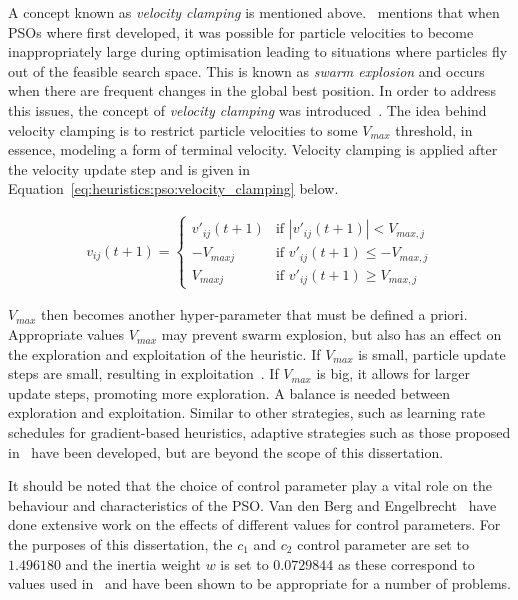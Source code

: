 A concept known as \textit{velocity clamping} is mentioned above.~\citeauthor{ref:vanwyk:2014}\cite{ref:vanwyk:2014} mentions that when \acp{PSO} where first developed, it was possible for particle velocities to become inappropriately large during optimisation leading to situations where particles fly out of the feasible search space. This is known as \textit{swarm explosion} and occurs when there are frequent changes in the global best position. In order to address this issues, the concept of \textit{velocity clamping} was introduced~\cite{ref:eberhart:1996}. The idea behind velocity clamping is to restrict particle velocities to some $V_{max}$ threshold, in essence, modeling a form of terminal velocity. Velocity clamping is applied after the velocity update step and is given in Equation~\ref{eq:heuristics:pso:velocity_clamping} below.

\begin{equation}
      \label{eq:heuristics:pso:velocity_clamping}
      \begin{split}
            v_{ij}(t+1)=
            \begin{cases}
                  v'_{ij}(t+1) & \text{if } |v'_{ij}(t+1)| < V_{max,j}   \\
                  -V_{maxj}    & \text{if } v'_{ij}(t+1) \leq -V_{max,j} \\
                  V_{maxj}     & \text{if } v'_{ij}(t+1) \geq V_{max,j}
            \end{cases}
      \end{split}
\end{equation}

$V_{max}$ then becomes another hyper-parameter that must be defined a priori. Appropriate values $V_{max}$ may prevent swarm explosion, but also has an effect on the exploration and exploitation of the heuristic. If $V_{max}$ is small, particle update steps are small, resulting in exploitation~\cite{ref:eberhart:1996}. If $V_{max}$ is big, it allows for larger update steps, promoting more exploration. A balance is needed between exploration and exploitation. Similar to other strategies, such as learning rate schedules for gradient-based heuristics, adaptive strategies such as those proposed in~\cite{ref:fan:2002} have been developed, but are beyond the scope of this dissertation.

It should be noted that the choice of control parameter play a vital role on the behaviour and characteristics of the \acs{PSO}. Van den Berg and Engelbrecht~\cite{ref:vandenberg:2007}\cite{ref:vandenberg:2006} have done extensive work on the effects of different values for control parameters. For the purposes of this dissertation, the $c_{1}$ and $c_{2}$ control parameter are set to $1.496180$ and the inertia weight $w$ is set to $0.0729844$ as these correspond to values used in~\cite{ref:eberhart:2000} and have been shown to be appropriate for a number of problems.

